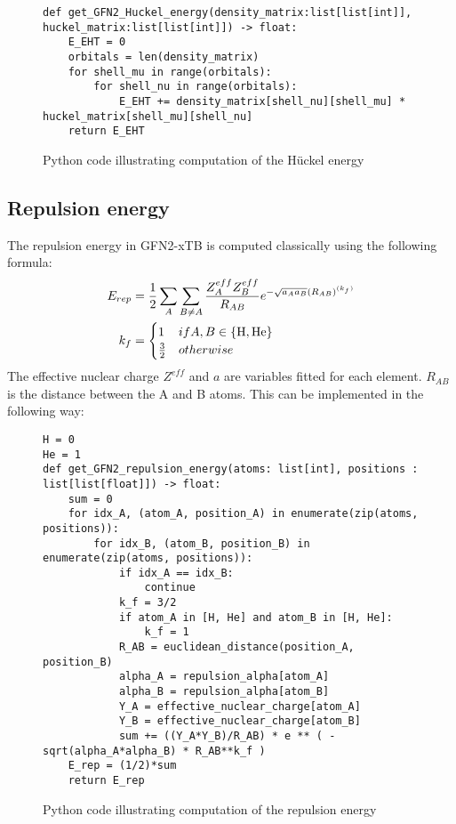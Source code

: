 \begin{figure}[H]
\begin{verbatim}
def get_GFN2_Huckel_energy(density_matrix:list[list[int]], huckel_matrix:list[list[int]]) -> float:
    E_EHT = 0
    orbitals = len(density_matrix)
    for shell_mu in range(orbitals):
        for shell_nu in range(orbitals):
            E_EHT += density_matrix[shell_nu][shell_mu] * huckel_matrix[shell_mu][shell_nu]
    return E_EHT
\end{verbatim}
\caption{Python code illustrating computation of the Hückel energy}
\end{figure}


\subsection{Repulsion energy}
The repulsion energy in GFN2-xTB is computed classically using the following formula:
\begin{align}
    \E{rep} &= \frac{1}{2}\sum_{A}\sum_{B\neq A}\frac{Z^{eff}_A Z^{eff}_B}{R_{AB}}e^{-\sqrt{a_Aa_B}(R_{AB})^{(k_f)}}\\
k_f &= \begin{cases}1 & if A,B\in\{\text{H},\text{He}\}\\\frac{3}{2}&otherwise\end{cases} 
\end{align}
The effective nuclear charge $Z^{eff}$ and $a$ are variables fitted for each element. 
$R_{AB}$ is the distance between the A and B atoms.
This can be implemented in the following way:

\begin{figure}[H]
\begin{verbatim}
H = 0
He = 1
def get_GFN2_repulsion_energy(atoms: list[int], positions : list[list[float]]) -> float:
    sum = 0
    for idx_A, (atom_A, position_A) in enumerate(zip(atoms, positions)):
        for idx_B, (atom_B, position_B) in enumerate(zip(atoms, positions)):
            if idx_A == idx_B:
                continue
            k_f = 3/2
            if atom_A in [H, He] and atom_B in [H, He]:
                k_f = 1
            R_AB = euclidean_distance(position_A, position_B)
            alpha_A = repulsion_alpha[atom_A]
            alpha_B = repulsion_alpha[atom_B]
            Y_A = effective_nuclear_charge[atom_A]
            Y_B = effective_nuclear_charge[atom_B]
            sum += ((Y_A*Y_B)/R_AB) * e ** ( - sqrt(alpha_A*alpha_B) * R_AB**k_f )
    E_rep = (1/2)*sum
    return E_rep
\end{verbatim}
\caption{Python code illustrating computation of the repulsion energy}
\end{figure}

